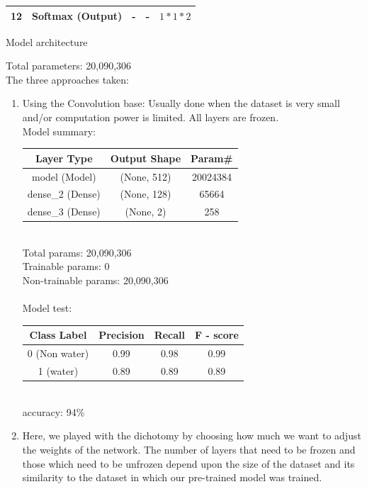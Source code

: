 \documentclass[12pt]{article}
\begin{document}
\begin{enumerate}
\begin{tabular}{|c|c|c|c|c|}
	12 & Softmax (Output) & - & - & $1*1*2$ \\ \hline
	\end{tabular}
	\begin{center}
	Model architecture\\
	\end{center}
Total parameters:  20,090,306\\[1cm]
The three approaches taken:\\
	\begin{enumerate}
	\item Using the Convolution base: Usually done when the dataset is very small and/or computation power is limited. All layers are frozen.\\	
Model summary:\\[0.5cm]
	\begin{tabular}{|c|c|c|}
	\hline
	Layer Type & Output Shape & Param\#\\ \hline
	model (Model) & (None, 512) & 20024384\\ \hline
	dense\_2 (Dense) & (None, 128) & 65664\\ \hline
	dense\_3 (Dense) & (None, 2) & 258\\ \hline
	\end{tabular}
\\[0.5cm]
Total params: 20,090,306\\
Trainable params: 0\\
Non-trainable params: 20,090,306\\[1cm]\\
Model test:\\[0.5cm]
	\begin{tabular}{|c|c|c|c|}
	\hline
Class Label & Precision & Recall & F - score\\ \hline
0 (Non water) & 0.99  & 0.98 & 0.99\\ \hline
1 (water) & 0.89 & 0.89 & 0.89\\ \hline
	\end{tabular}
\\
accuracy: 94\%\\
	\item Here, we played with the dichotomy by choosing how much we want to adjust the weights of the network. The number of layers that need to be frozen and those which need to be unfrozen depend upon the size of the dataset and its similarity to the dataset in which our pre-trained model was trained.
	\begin{figure}[h!]	
		\begin{center}

\end{center}
\end{figure}
\end{enumerate}
\end{enumerate}
\end{document}
